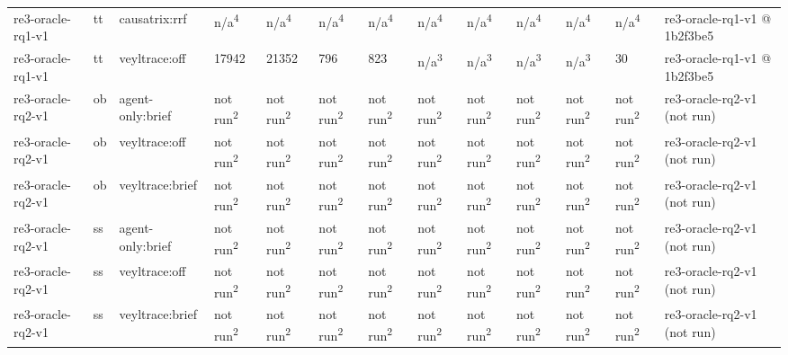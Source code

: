 \begin{table}[t]
\begin{tabular}{lllllllllllll}
re3-oracle-rq1-v1 & tt & causatrix:rrf & n/a\textsuperscript{4} & n/a\textsuperscript{4} & n/a\textsuperscript{4} & n/a\textsuperscript{4} & n/a\textsuperscript{4} & n/a\textsuperscript{4} & n/a\textsuperscript{4} & n/a\textsuperscript{4} & n/a\textsuperscript{4} & re3-oracle-rq1-v1 @ 1b2f3be5 \\
re3-oracle-rq1-v1 & tt & veyltrace:off & 17942 & 21352 & 796 & 823 & n/a\textsuperscript{3} & n/a\textsuperscript{3} & n/a\textsuperscript{3} & n/a\textsuperscript{3} & 30 & re3-oracle-rq1-v1 @ 1b2f3be5 \\
re3-oracle-rq2-v1 & ob & agent-only:brief & not run\textsuperscript{2} & not run\textsuperscript{2} & not run\textsuperscript{2} & not run\textsuperscript{2} & not run\textsuperscript{2} & not run\textsuperscript{2} & not run\textsuperscript{2} & not run\textsuperscript{2} & not run\textsuperscript{2} & re3-oracle-rq2-v1 (not run) \\
re3-oracle-rq2-v1 & ob & veyltrace:off & not run\textsuperscript{2} & not run\textsuperscript{2} & not run\textsuperscript{2} & not run\textsuperscript{2} & not run\textsuperscript{2} & not run\textsuperscript{2} & not run\textsuperscript{2} & not run\textsuperscript{2} & not run\textsuperscript{2} & re3-oracle-rq2-v1 (not run) \\
re3-oracle-rq2-v1 & ob & veyltrace:brief & not run\textsuperscript{2} & not run\textsuperscript{2} & not run\textsuperscript{2} & not run\textsuperscript{2} & not run\textsuperscript{2} & not run\textsuperscript{2} & not run\textsuperscript{2} & not run\textsuperscript{2} & not run\textsuperscript{2} & re3-oracle-rq2-v1 (not run) \\
re3-oracle-rq2-v1 & ss & agent-only:brief & not run\textsuperscript{2} & not run\textsuperscript{2} & not run\textsuperscript{2} & not run\textsuperscript{2} & not run\textsuperscript{2} & not run\textsuperscript{2} & not run\textsuperscript{2} & not run\textsuperscript{2} & not run\textsuperscript{2} & re3-oracle-rq2-v1 (not run) \\
re3-oracle-rq2-v1 & ss & veyltrace:off & not run\textsuperscript{2} & not run\textsuperscript{2} & not run\textsuperscript{2} & not run\textsuperscript{2} & not run\textsuperscript{2} & not run\textsuperscript{2} & not run\textsuperscript{2} & not run\textsuperscript{2} & not run\textsuperscript{2} & re3-oracle-rq2-v1 (not run) \\
re3-oracle-rq2-v1 & ss & veyltrace:brief & not run\textsuperscript{2} & not run\textsuperscript{2} & not run\textsuperscript{2} & not run\textsuperscript{2} & not run\textsuperscript{2} & not run\textsuperscript{2} & not run\textsuperscript{2} & not run\textsuperscript{2} & not run\textsuperscript{2} & re3-oracle-rq2-v1 (not run) \\

\end{tabular}
\end{table}
